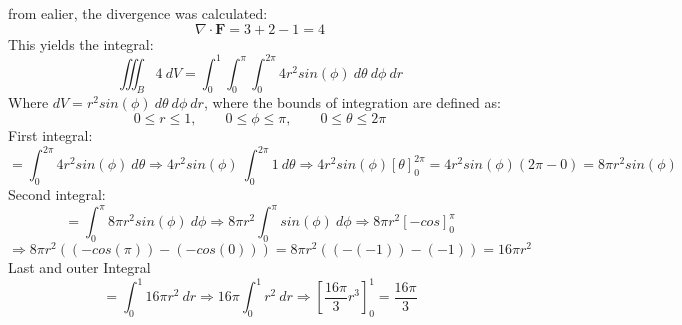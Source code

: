 from ealier, the divergence was calculated:
\[\nabla \cdot \mathbf{F} = 3 + 2 - 1 = 4\]
This yields the integral:
\[\iiint_B 4 \ dV = \int_{0}^{1}\int_{0}^{\pi}\int_{0}^{2\pi} 4r^2 sin(\phi) \ d\theta \ d\phi \ dr\]
Where $dV = r^2 sin(\phi) \ d\theta \ d\phi \ dr$, where the bounds of integration are defined as:
\[
0 \le r \le 1,
\qquad
0 \le \phi \le \pi,
\qquad
0 \le \theta \le 2\pi
\]
First integral:
\[= \int_{0}^{2\pi} 4r^2 sin(\phi) \ d\theta \Rightarrow 4r^2 sin(\phi) \ \int_{0}^{2\pi} 1 \ d\theta \Rightarrow 4r^2sin(\phi) \left[\theta\right]_0^{2\pi} = 4r^2sin(\phi)(2\pi - 0) = 8\pi r^2 sin(\phi)\]
Second integral:
\[= \int_{0}^{\pi} 8\pi r^2 sin(\phi) \  d\phi \Rightarrow 8\pi r^2 \int_{0}^{\pi} sin(\phi) \ d\phi \Rightarrow 8\pi r^2 \left[-cos\right]_0^\pi\] 
\[\Rightarrow 8\pi r^2 ((-cos(\pi))-(-cos(0))) = 8\pi r^2 ((-(-1))-(-1)) = 16\pi r^2 \] 
Last and outer Integral
\[= \int_{0}^{1}16\pi r^2 \ dr \Rightarrow 16\pi \int_{0}^{1} r^2 \ dr \Rightarrow \left[\frac{16\pi}{3}r^3\right]_0^1 = \frac{16\pi}{3}\]
\[\]
\[\]

